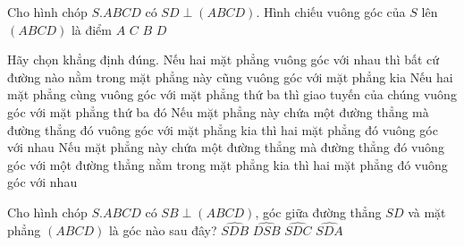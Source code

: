 \begin{ex}%
	Cho hình chóp $S.ABCD$ có $SD \perp (ABCD)$. Hình chiếu vuông góc của $S$ lên $(ABCD)$ là điểm
	\choice
	{$A$}
	{$C$}
	{$B$}
	{\True $D$}
	\end{ex}

\begin{ex}%
Hãy chọn khẳng định đúng.
\choice
{Nếu hai mặt phẳng vuông góc với nhau thì bất cứ đường nào nằm trong mặt phẳng này cũng vuông góc với mặt phẳng kia}
{Nếu hai mặt phẳng cùng vuông góc với mặt phẳng thứ ba thì giao tuyến của chúng vuông góc với mặt phẳng thứ ba đó}
{\True Nếu mặt phẳng này chứa một đường thẳng mà đường thẳng đó vuông góc với mặt phẳng kia thì hai mặt phẳng đó vuông góc với nhau}
{Nếu mặt phẳng này chứa một đường thẳng mà đường thẳng đó vuông góc với một đường thẳng nằm trong mặt phẳng kia thì hai mặt phẳng đó vuông góc với nhau}
\end{ex}

\begin{ex}%
	Cho hình chóp $ S.ABCD $ có $ SB\perp (ABCD)$, góc giữa đường thẳng $ SD $ và mặt phẳng $(ABCD)$ là góc nào sau đây?
\choice
{\True $\widehat{SDB}$}
{$\widehat{DSB}$}
{$\widehat{SDC}$}
{$\widehat{SDA}$}

\end{ex}

